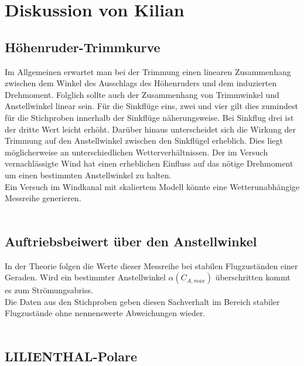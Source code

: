 \newpage

\section{Diskussion von Kilian}
\subsection{Höhenruder-Trimmkurve}

Im Allgemeinen erwartet man bei der Trimmung einen linearen Zusammenhang zwischen dem Winkel des Ausschlags des Höhenruders und dem induzierten Drehmoment. Folglich sollte auch der Zusammenhang von Trimmwinkel und Anstellwinkel linear sein. Für die Sinkflüge eins, zwei und vier gilt dies zumindest für die Stichproben innerhalb der Sinkflüge näherungsweise. Bei Sinkflug drei ist der dritte Wert leicht erhöht. Darüber hinaus unterscheidet sich die Wirkung der Trimmung auf den Anstellwinkel zwischen den Sinkflügel erheblich. Dies liegt möglicherweise an unterschiedlichen Wetterverhältnissen. Der im Versuch vernachlässigte Wind hat einen erheblichen Einfluss auf das nötige Drehmoment um einen bestimmten Anstellwinkel zu halten.\\
Ein Versuch im Windkanal mit skaliertem Modell könnte eine Wetterunabhängige Messreihe generieren.\\\\

\subsection{Auftriebsbeiwert über den Anstellwinkel}

In der Theorie folgen die Werte dieser Messreihe bei stabilen Flugzuständen einer Geraden. Wird ein bestimmter Anstellwinkel $\alpha({C_{A,max}})$ überschritten kommt es zum Strömungsabriss.\\
Die Daten aus den Stichproben geben diesen Sachverhalt im Bereich stabiler Flugzustände ohne nennenswerte Abweichungen wieder.\\\\

\subsection{LILIENTHAL-Polare}

